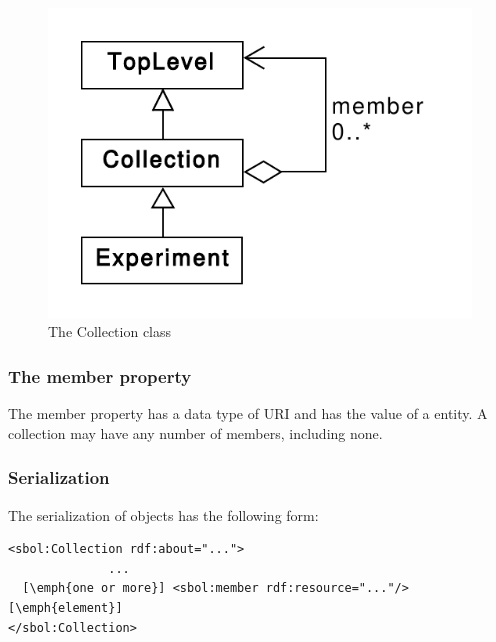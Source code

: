 \begin{figure}[ht]
\begin{center}
\includegraphics[scale=0.6]{uml/collection}
\caption[]{The Collection class}
\label{uml:collection}
\end{center}
\end{figure}

\subsubsection*{The member property}
The member property has a data type of URI and has the  value of a  entity.  A collection may have any number of members, including none.

\subsubsection*{Serialization}

The serialization of  objects has the following form:

\begin{lstlisting}
<sbol:Collection rdf:about="...">
              ...
  [\emph{one or more}] <sbol:member rdf:resource="..."/> [\emph{element}]
</sbol:Collection>
\end{lstlisting}


